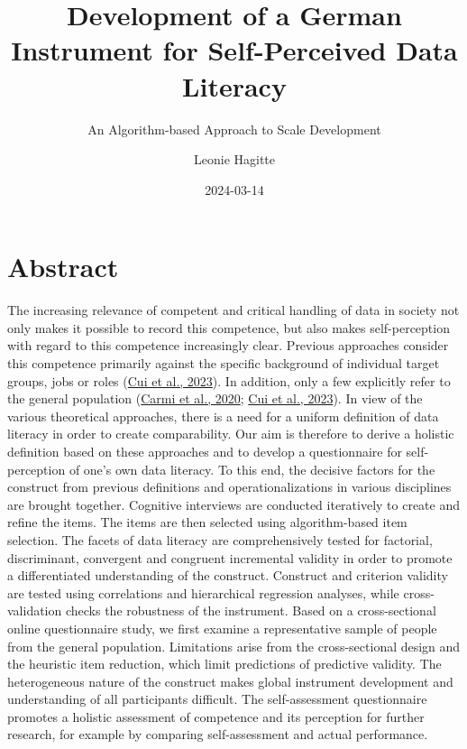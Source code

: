\documentclass[
  12pt,
  a4paper,
  twoside]{article}
\title{Development of a German Instrument for Self-Perceived Data Literacy}
\subtitle{An Algorithm-based Approach to Scale Development}
\author{Leonie Hagitte}
\date{2024-03-14}
\begin{document}
\maketitle

{
\setcounter{tocdepth}{2}
\tableofcontents
}
\newpage\null\thispagestyle{empty}\newpage

\hypertarget{abstract}{%
\section*{Abstract}\label{abstract}}

The increasing relevance of competent and critical handling of data in society not only makes it possible to record this competence, but also makes self-perception with regard to this competence increasingly clear. Previous approaches consider this competence primarily against the specific background of individual target groups, jobs or roles (\protect\hyperlink{ref-Cui2023}{Cui et al., 2023}). In addition, only a few explicitly refer to the general population (\protect\hyperlink{ref-Carmi2020}{Carmi et al., 2020}; \protect\hyperlink{ref-Cui2023}{Cui et al., 2023}). In view of the various theoretical approaches, there is a need for a uniform definition of data literacy in order to create comparability.
Our aim is therefore to derive a holistic definition based on these approaches and to develop a questionnaire for self-perception of one's own data literacy. To this end, the decisive factors for the construct from previous definitions and operationalizations in various disciplines are brought together. Cognitive interviews are conducted iteratively to create and refine the items. The items are then selected using algorithm-based item selection. The facets of data literacy are comprehensively tested for factorial, discriminant, convergent and congruent incremental validity in order to promote a differentiated understanding of the construct. Construct and criterion validity are tested using correlations and hierarchical regression analyses, while cross-validation checks the robustness of the instrument.
Based on a cross-sectional online questionnaire study, we first examine a representative sample of people from the general population. Limitations arise from the cross-sectional design and the heuristic item reduction, which limit predictions of predictive validity. The heterogeneous nature of the construct makes global instrument development and understanding of all participants difficult.
The self-assessment questionnaire promotes a holistic assessment of competence and its perception for further research, for example by comparing self-assessment and actual performance.
\end{document}
